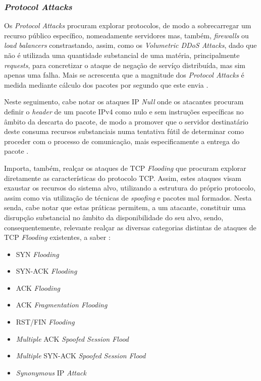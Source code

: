 \subsubsection{\textit{Protocol Attacks}}
Os \textit{Protocol Attacks} procuram explorar protocolos, de modo a sobrecarregar um recurso público específico, nomeadamente servidores mas, também, \textit{firewalls} ou \textit{load balancers} constrastando, assim, como os \textit{Volumetric DDoS Attacks}, dado que não é utilizada uma quantidade substancial de uma matéria, principalmente \textit{requests}, para concretizar o ataque de negação de servíço distribuída, mas sim apenas uma falha. Mais se acrescenta que a magnitude dos \textit{Protocol Attacks} é medida mediante cálculo dos pacotes por segundo que este envia \cite{esecurityplanet_types_of_ddos_attacks}.


Neste seguimento, cabe notar os ataques IP \textit{Null} onde os atacantes procuram definir o \textit{header} de um pacote IPv4 como nulo e sem instruções específicas no âmbito da descarta do pacote, de modo a promover que o servidor destinatário deste consuma recursos substanciais numa tentativa fútil de determinar como proceder com o processo de comunicação, mais especificamente a entrega do pacote \cite{esecurityplanet_types_of_ddos_attacks}.

Importa, também, realçar os ataques de TCP \textit{Flooding} que procuram explorar diretamente as características do protocolo TCP. Assim, estes ataques visam exaustar os recursos do sistema alvo, utilizando a estrutura do próprio protocolo, assim como via utilização de técnicas de \textit{spoofing} e pacotes mal formados. Nesta senda, cabe notar que estas práticas permitem, a um atacante, constituir uma disrupção substancial no âmbito da disponibilidade do seu alvo, sendo, consequentemente, relevante realçar as diversas categorias distintas de ataques de TCP \textit{Flooding} existentes, a saber \cite{esecurityplanet_types_of_ddos_attacks,connectwise_types_of_ddos_attacks}:
\begin{itemize}
    \item SYN \textit{Flooding}
    \item SYN-ACK \textit{Flooding}
    \item ACK \textit{Flooding}
    \item ACK \textit{Fragmentation Flooding}
    \item RST/FIN \textit{Flooding}
    \item \textit{Multiple} ACK \textit{Spoofed Session Flood}
    \item \textit{Multiple} SYN-ACK \textit{Spoofed Session Flood}
    \item \textit{Synonymous} IP \textit{Attack}
\end{itemize}


